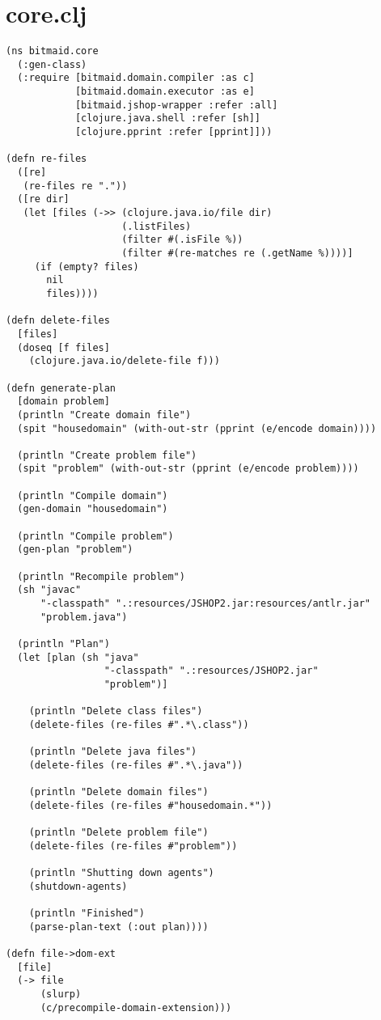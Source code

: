 \section{core.clj}
\begin{lstlisting}
(ns bitmaid.core
  (:gen-class)
  (:require [bitmaid.domain.compiler :as c]
            [bitmaid.domain.executor :as e]
            [bitmaid.jshop-wrapper :refer :all]
            [clojure.java.shell :refer [sh]]
            [clojure.pprint :refer [pprint]]))

(defn re-files
  ([re]
   (re-files re "."))
  ([re dir]
   (let [files (->> (clojure.java.io/file dir)
                    (.listFiles)
                    (filter #(.isFile %))
                    (filter #(re-matches re (.getName %))))]
     (if (empty? files)
       nil
       files))))

(defn delete-files
  [files]
  (doseq [f files]
    (clojure.java.io/delete-file f)))

(defn generate-plan
  [domain problem]
  (println "Create domain file")
  (spit "housedomain" (with-out-str (pprint (e/encode domain))))

  (println "Create problem file")
  (spit "problem" (with-out-str (pprint (e/encode problem))))

  (println "Compile domain")
  (gen-domain "housedomain")

  (println "Compile problem")
  (gen-plan "problem")

  (println "Recompile problem")
  (sh "javac"
      "-classpath" ".:resources/JSHOP2.jar:resources/antlr.jar"
      "problem.java")

  (println "Plan")
  (let [plan (sh "java"
                 "-classpath" ".:resources/JSHOP2.jar"
                 "problem")]

    (println "Delete class files")
    (delete-files (re-files #".*\.class"))

    (println "Delete java files")
    (delete-files (re-files #".*\.java"))

    (println "Delete domain files")
    (delete-files (re-files #"housedomain.*"))

    (println "Delete problem file")
    (delete-files (re-files #"problem"))

    (println "Shutting down agents")
    (shutdown-agents)

    (println "Finished")
    (parse-plan-text (:out plan))))

(defn file->dom-ext
  [file]
  (-> file
      (slurp)
      (c/precompile-domain-extension)))


\end{lstlisting}
